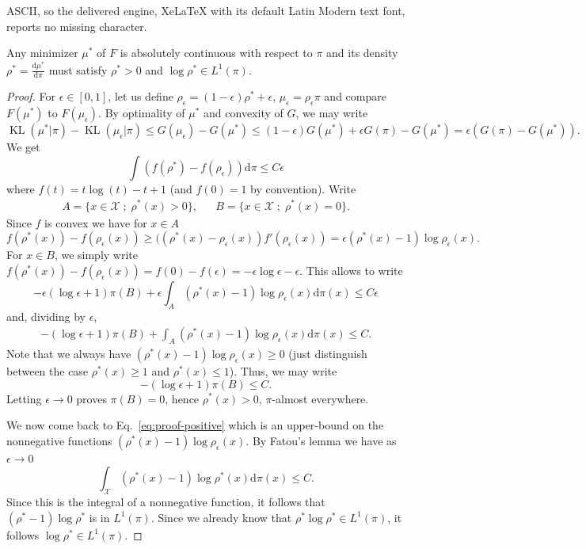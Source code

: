 \documentclass[10pt,a4paper]{amsart}
\DeclareMathOperator{\KL}{KL}
\newcommand{\Xx}{\mathcal{X}}
\renewcommand{\d}{\mathrm{d}}
\begin{document}
ASCII, so the delivered engine, XeLaTeX with its default Latin Modern text font, reports no missing character.
\begin{lemma}\label{lem:positive-minimizer}
Any minimizer $\mu^*$ of $F$ is absolutely continuous with respect to $\pi$ and its density $\rho^*=\frac{\d \mu^*}{\d \pi}$ must satisfy $\rho^*>0$ and $\log \rho^*\in L^1(\pi)$.
\end{lemma}

\begin{proof}
For $\epsilon\in [0,1]$, let us define $\rho_\epsilon = (1-\epsilon)\rho^*+\epsilon$, $\mu_\epsilon=\rho_\epsilon \pi$ and compare $F(\mu^*)$ to $F(\mu_\epsilon)$. By optimality of $\mu^*$ and convexity of $G$, we may write
$$
\KL(\mu^*|\pi)- \KL(\mu_\epsilon|\pi) \leq G(\mu_\epsilon) - G(\mu^*)\leq (1-\epsilon) G(\mu^*) +\epsilon G(\pi) - G(\mu^*) = \epsilon (G(\pi)-G(\mu^*)).
$$
We get 
$$
\int ( f(\rho^*)-f(\rho_\epsilon))\d\pi \leq C\epsilon
$$
where $f(t)=t\log(t)-t+1$ (and $f(0)=1$ by convention). Write 
\begin{align*}
A = \{x\in \Xx\;;\; \rho^*(x)>0\}, && B = \{x\in \Xx\;;\; \rho^*(x)=0\}.
\end{align*}
Since $f$ is convex we have for $x\in A$
$$
f(\rho^*(x))-f(\rho_\epsilon(x)) \geq ((\rho^*(x)-\rho_\epsilon(x))f'(\rho_\epsilon(x)) = \epsilon (\rho^*(x)-1)\log \rho_\epsilon(x).
$$
For $x\in B$, we simply write $f(\rho^*(x))-f(\rho_\epsilon(x)) =f(0)-f(\epsilon)=-\epsilon \log \epsilon -\epsilon$. This allows to write
$$
-\epsilon (\log \epsilon +1)\pi(B) +\epsilon  \int_{A} (\rho^*(x)-1)\log \rho_\epsilon(x) \d\pi(x) \leq C\epsilon
$$
and, dividing by $\epsilon$,
\begin{align}\label{eq:proof-positive}
-(\log \epsilon +1)\pi(B) +  \int_{A} (\rho^*(x)-1)\log \rho_\epsilon(x) \d\pi(x) \leq C.
\end{align}
Note that we always have $(\rho^*(x)-1)\log \rho_\epsilon(x)\geq 0$ (just distinguish between the case $\rho^*(x)\geq 1$ and $\rho^*(x)\leq 1$). Thus, we may write
$$
-(\log \epsilon +1)\pi(B) \leq C.
$$
Letting $\epsilon\to 0$ proves $\pi(B)=0$, hence $\rho^*(x)>0$, $\pi$-almost everywhere.

We now come back to Eq.~\eqref{eq:proof-positive} which is an upper-bound on the nonnegative functions $(\rho^*(x)-1)\log \rho_\epsilon(x)$. By Fatou's lemma we have as $\epsilon\to 0$
$$
\int_{\Xx} (\rho^*(x)-1)\log \rho^*(x) \d\pi(x) \leq C.
$$
Since this is the integral of a nonnegative function, it follows that $(\rho^*-1)\log \rho^*$ is in $L^1(\pi)$. Since we already know that $\rho^*\log \rho^*\in L^1(\pi)$, it follows $\log \rho^* \in L^1(\pi)$.
\end{proof}
\end{document}
